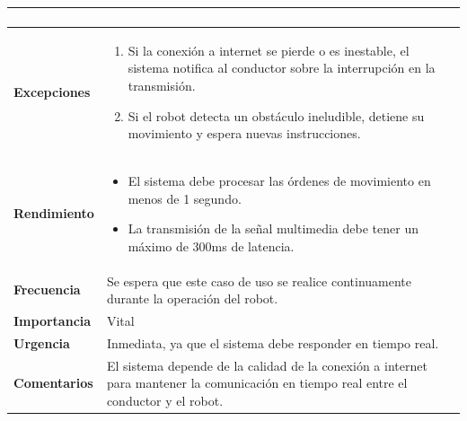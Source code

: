 \begin{longtable}{|p{4cm}|p{10cm}|}
\begin{enumerate}
        \end{enumerate} \\ \hline
        \textbf{Excepciones}       & 
        \begin{enumerate}
            \item Si la conexi\'on a internet se pierde o es inestable, el sistema notifica al conductor sobre la interrupci\'on en la transmisi\'on.
            \item Si el robot detecta un obst\'aculo ineludible, detiene su movimiento y espera nuevas instrucciones.
        \end{enumerate} \\ \hline
        \textbf{Rendimiento}       & 
        \begin{itemize}
            \item El sistema debe procesar las \'ordenes de movimiento en menos de 1 segundo.
            \item La transmisi\'on de la se\~nal multimedia debe tener un m\'aximo de 300ms de latencia.
        \end{itemize} \\ \hline
        \textbf{Frecuencia}        & Se espera que este caso de uso se realice continuamente durante la operaci\'on del robot. \\ \hline
        \textbf{Importancia}       & Vital \\ \hline
        \textbf{Urgencia}          & Inmediata, ya que el sistema debe responder en tiempo real. \\ \hline
        \textbf{Comentarios}       & El sistema depende de la calidad de la conexi\'on a internet para mantener la comunicaci\'on en tiempo real entre el conductor y el robot. \\ \hline
        \end{longtable}

        \clearpage

